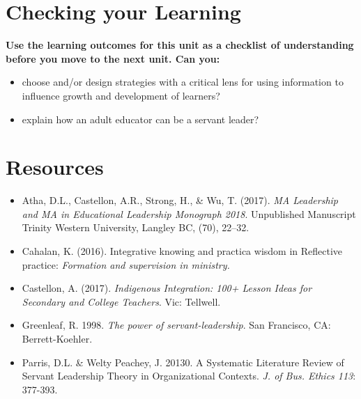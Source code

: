 \documentclass[
]{book}
\providecommand{\tightlist}{%
  \setlength{\itemsep}{0pt}\setlength{\parskip}{0pt}}
\begin{document}
\hypertarget{checking-your-learning-6}{%
\section*{Checking your Learning}\label{checking-your-learning-6}}

\begin{progress}
\textbf{Use the learning outcomes for this unit as a checklist of
understanding before you move to the next unit. Can you:}

\begin{itemize}
\tightlist
\item
  choose and/or design strategies with a critical lens for using
  information to influence growth and development of learners?\\
\item
  explain how an adult educator can be a servant leader?
\end{itemize}
\end{progress}

\hypertarget{resources-1}{%
\section*{Resources}\label{resources-1}}

\begin{itemize}
\tightlist
\item
  Atha, D.L., Castellon, A.R., Strong, H., \& Wu, T. (2017). \emph{MA Leadership and MA in Educational Leadership Monograph 2018}. Unpublished Manuscript Trinity Western University, Langley BC, (70), 22--32.\\
\item
  Cahalan, K. (2016). Integrative knowing and practica wisdom in Reflective practice: \emph{Formation and supervision in ministry.}\\
\item
  Castellon, A. (2017). \emph{Indigenous Integration: 100+ Lesson Ideas for Secondary and College Teachers}. Vic: Tellwell.\\
\item
  Greenleaf, R. 1998. \emph{The power of servant-leadership}. San Francisco, CA: Berrett-Koehler.\\
\item
  Parris, D.L. \& Welty Peachey, J. 20130. A Systematic Literature Review of Servant Leadership Theory in Organizational Contexts. \emph{J. of Bus. Ethics 113}: 377-393.
\end{itemize}
\end{document}
